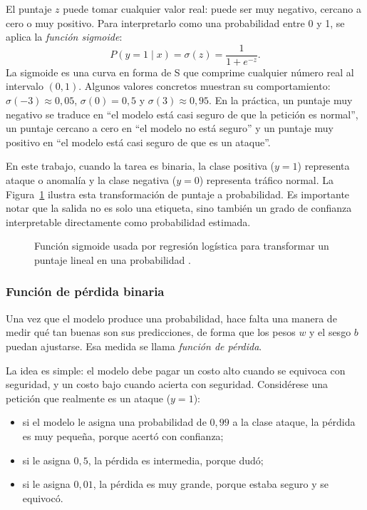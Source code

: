 \documentclass[12pt,oneside]{report}
\begin{document}
El puntaje $z$ puede tomar cualquier valor real: puede ser muy negativo,
cercano a cero o muy positivo. Para interpretarlo como una probabilidad
entre 0 y 1, se aplica la \textit{función sigmoide}:
\[
P(y=1\mid x)=\sigma(z)=\frac{1}{1+e^{-z}}.
\]
La sigmoide es una curva en forma de S que comprime cualquier número real
al intervalo $(0,1)$. Algunos valores concretos muestran su comportamiento:
$\sigma(-3)\approx 0{,}05$, $\sigma(0)=0{,}5$ y $\sigma(3)\approx 0{,}95$.
En la práctica, un puntaje muy negativo se traduce en ``el modelo está casi
seguro de que la petición es normal'', un puntaje cercano a cero en ``el modelo
no está seguro'' y un puntaje muy positivo en ``el modelo está casi seguro de
que es un ataque''.

En este trabajo, cuando la tarea es binaria, la clase positiva ($y=1$)
representa ataque o anomalía y la clase negativa ($y=0$) representa tráfico
normal. La Figura~\ref{fig:sigmoid} ilustra esta transformación de puntaje a
probabilidad. Es importante notar que la salida no es solo una etiqueta, sino
también un grado de confianza interpretable directamente como probabilidad
estimada.

\begin{figure}[H]
\centering
{}
\caption{Función sigmoide usada por regresión logística para transformar un
puntaje lineal en una probabilidad \cite{islr_logreg}.}
\label{fig:sigmoid}
\end{figure}

\subsubsection{Función de pérdida binaria}

Una vez que el modelo produce una probabilidad, hace falta una manera de
medir qué tan buenas son sus predicciones, de forma que los pesos $w$ y el
sesgo $b$ puedan ajustarse. Esa medida se llama \textit{función de pérdida}.

La idea es simple: el modelo debe pagar un costo alto cuando se
equivoca con seguridad, y un costo bajo cuando acierta con seguridad.
Considérese una petición que realmente es un ataque ($y=1$):
\begin{itemize}
  \item si el modelo le asigna una probabilidad de $0{,}99$ a la clase
        ataque, la pérdida es muy pequeña, porque acertó con confianza;
  \item si le asigna $0{,}5$, la pérdida es intermedia, porque dudó;
  \item si le asigna $0{,}01$, la pérdida es muy grande, porque estaba
        seguro y se equivocó.
\end{itemize}
\end{document}
